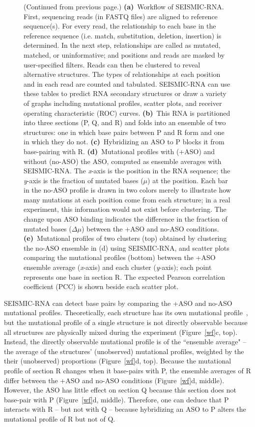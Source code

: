 \documentclass[main.tex]{subfiles}
\begin{document}
\begin{figure}[H]
	\caption[]{(Continued from previous page.) \textbf{(a)}~Workflow of SEISMIC-RNA. First, sequencing reads (in FASTQ files) are aligned to reference sequence(s). For every read, the relationship to each base in the reference sequence (i.e. match, substitution, deletion, insertion) is determined. In the next step, relationships are called as mutated, matched, or uninformative; and positions and reads are masked by user-specified filters. Reads can then be clustered to reveal alternative structures. The types of relationships at each position and in each read are counted and tabulated. SEISMIC-RNA can use these tables to predict RNA secondary structures or draw a variety of graphs including mutational profiles, scatter plots, and receiver operating characteristic (ROC) curves. \textbf{(b)}~This RNA is partitioned into three sections (P, Q, and R) and folds into an ensemble of two structures: one in which base pairs between P and R form and one in which they do not. \textbf{(c)}~Hybridizing an ASO to P blocks it from base-pairing with R. \textbf{(d)}~Mutational profiles with (+ASO) and without (no-ASO) the ASO, computed as ensemble averages with SEISMIC-RNA. The \textit{x}-axis is the position in the RNA sequence; the \textit{y}-axis is the fraction of mutated bases ($\mu$) at the position. Each bar in the no-ASO profile is drawn in two colors merely to illustrate how many mutations at each position come from each structure; in a real experiment, this information would not exist before clustering. The change upon ASO binding indicates the difference in the fraction of mutated bases ($\Delta \mu$) between the +ASO and no-ASO conditions. \textbf{(e)}~Mutational profiles of two clusters (top) obtained by clustering the no-ASO ensemble in (d) using SEISMIC-RNA, and scatter plots comparing the mutational profiles (bottom) between the +ASO ensemble average (\textit{x}-axis) and each cluster (\textit{y}-axis); each point represents one base in section R. The expected Pearson correlation coefficient (PCC) is shown beside each scatter plot.}
\end{figure}

SEISMIC-RNA can detect base pairs by comparing the +ASO and no-ASO mutational profiles.
Theoretically, each structure has its own mutational profile~\cite{Sherpa2015}, but the mutational profile of a single structure is not directly observable because all structures are physically mixed during the experiment (Figure~\ref{wf}c, top).
Instead, the directly observable mutational profile is of the ``ensemble average" -- the average of the structures' (unobserved) mutational profiles, weighted by the their (unobserved) proportions (Figure~\ref{wf}d, top).
Because the mutational profile of section R changes when it base-pairs with P, the ensemble averages of R differ between the +ASO and no-ASO conditions (Figure~\ref{wf}d, middle).
However, the ASO has little effect on section Q because this section does not base-pair with P (Figure~\ref{wf}d, middle).
Therefore, one can deduce that P interacts with R -- but not with Q -- because hybridizing an ASO to P alters the mutational profile of R but not of Q.
\end{document}
